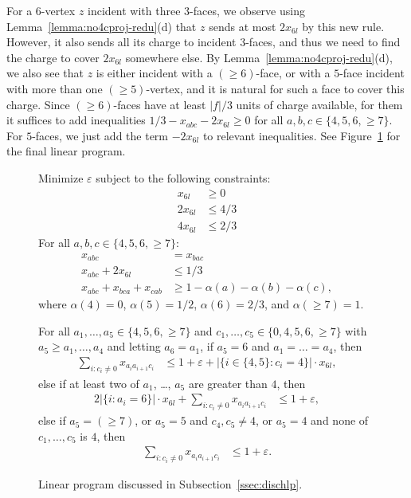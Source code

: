 \documentclass[12pt,twoside,openright,a4paper]{book}
\begin{document}
For a $6$-vertex $z$ incident with three $3$-faces, we observe using Lemma~\ref{lemma:no4cproj-redu}(d) that
$z$ sends at most $2x_{6l}$ by this new rule.  However, it also sends all its charge to incident $3$-faces,
and thus we need to find the charge to cover $2x_{6l}$ somewhere else.  By Lemma~\ref{lemma:no4cproj-redu}(d),
we also see that $z$ is either incident with a $(\ge\!6)$-face, or with a $5$-face incident with more than one $(\ge\!5)$-vertex,
and it is natural for such a face to cover this charge.  Since $(\ge\!6)$-faces have at least $|f|/3$ units of charge available,
for them it suffices to add inequalities $1/3-x_{abc}-2x_{6l}\ge 0$ for all $a,b,c\in\{4,5,6,{\ge\!7}\}$.  For $5$-faces,
we just add the term $-2x_{6l}$ to relevant inequalities.  See Figure~\ref{fig:dischlp} for the final linear program.

\begin{figure}
\begin{framed}
Minimize $\varepsilon$ subject to the following constraints:
\begin{align*}
x_{6l}&\ge 0\\
2x_{6l}&\le 4/3\\
4x_{6l}&\le 2/3
\end{align*}
For all $a,b,c\in\{4,5,6,{\ge\!7}\}$:
\begin{align*}
x_{abc}&=x_{bac}\\
x_{abc}+2x_{6l}&\le 1/3\\
x_{abc}+x_{bca}+x_{cab}&\ge 1-\alpha(a)-\alpha(b)-\alpha(c),
\end{align*}
where $\alpha(4)=0$, $\alpha(5)=1/2$, $\alpha(6)=2/3$, and $\alpha({\ge\!7})=1$.

For all $a_1,\ldots,a_5\in \{4,5,6,{\ge\!7}\}$ and $c_1,\ldots, c_5\in \{0,4,5,6,{\ge\!7}\}$
with $a_5\ge a_1,\ldots, a_4$ and letting $a_6=a_1$, if $a_5=6$ and $a_1=\ldots=a_4$, then
\begin{align*}
\sum_{i: c_i\neq 0} x_{a_ia_{i+1}c_i}&\le 1+\varepsilon+|\{i\in\{4,5\}:c_i=4\}|\cdot x_{6l},
\end{align*}
else if at least two of $a_1$, \ldots, $a_5$ are greater than $4$, then
\begin{align*}
2|\{i:a_i=6\}|\cdot x_{6l}+\sum_{i: c_i\neq 0} x_{a_ia_{i+1}c_i}&\le 1+\varepsilon,
\end{align*}
else if $a_5=(\ge\!7)$, or $a_5=5$ and $c_4,c_5\neq 4$, or $a_5=4$ and none of $c_1,\ldots, c_5$ is $4$, then
\begin{align*}
\sum_{i: c_i\neq 0} x_{a_ia_{i+1}c_i}&\le 1+\varepsilon.
\end{align*}
\end{framed}

\caption{Linear program discussed in Subsection~\ref{ssec:dischlp}.}\label{fig:dischlp}
\end{figure}
\end{document}
